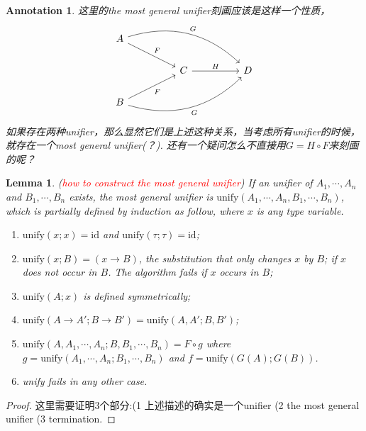 \documentclass{article}
\theoremstyle{plain}
\newtheorem{lemma}[theorem]{Lemma}
\newtheorem{annotation}[theorem]{Annotation}
\theoremstyle{nonumberplain}
\newtheorem{proof}{Proof}
\newcommand{\redt}[1]{\textcolor{red}{#1}}
\begin{document}
\begin{annotation}
\rm 这里的the most general unifier刻画应该是这样一个性质，
\[
\begin{tikzcd}
A \arrow[rrd, "F"] \arrow[rrrrd, "G", bend left]    &  &                   &  &   \\
                                                    &  & C \arrow[rr, "H"] &  & D \\
B \arrow[rru, "F"'] \arrow[rrrru, "G"', bend right] &  &                   &  &  
\end{tikzcd}
\]
如果存在两种unifier，那么显然它们是上述这种关系，当考虑所有unifier的时候，就存在一个most general unifier(？). 还有一个疑问怎么不直接用$G = H \circ F$来刻画的呢？
\end{annotation}

\begin{lemma}
\rm (\redt{how to construct the most general unifier}) If an unifier of ${A_1,\cdots,A_n}$ and $B_1,\cdots,B_n$ exists, the most general unifier is $\text{unify}(A_1,\cdots,A_n,B_1,\cdots,B_n)$, which is partially defined by induction as follow, where $x$ is any type variable.
\begin{enumerate}
	\item $\text{unify}(x;x) = \text{id}$ and $\text{unify}(\tau;\tau) = \text{id}$;
	\item $\text{unify}(x;B) = (x \to B)$, the substitution that only changes $x$ by $B$; if $x$ does not occur in $B$. The algorithm fails if $x$ occurs in $B$;
	\item $\text{unify}(A;x)$ is defined symmetrically;
	\item $\text{unify}(A \to A'; B \to B') = \text{unify}(A,A';B,B')$;
	\item $\text{unify}(A,A_1,\cdots,A_n;B,B_1,\cdots,B_n) = F \circ g$ where $g = \text{unify}(A_1,\cdots,A_n;B_1,\cdots,B_n)$ and $f = \text{unify}(G(A);G(B))$.
	\item unify fails in any other case.
\end{enumerate}
\end{lemma}

\begin{proof}
\rm 这里需要证明3个部分:(1 上述描述的确实是一个unifier (2 the most general unifier (3 termination. 
\end{proof}
\end{document}

